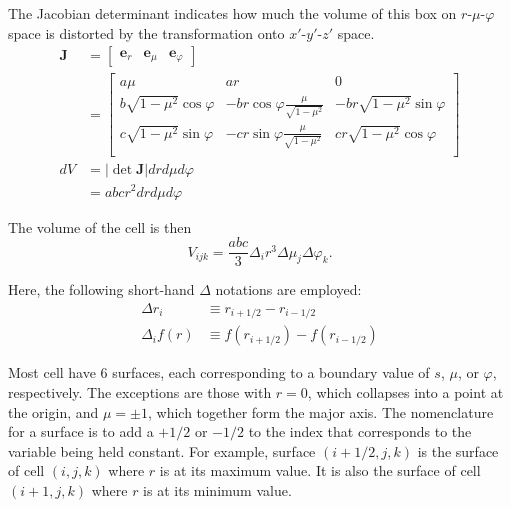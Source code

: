The Jacobian determinant indicates how much the volume of this box on $r$-$\mu$-$\varphi$ space is distorted by the transformation onto $x'$-$y'$-$z'$ space.
\begin{subequations}
    \begin{align}
        \mathbf{J} &= \begin{bmatrix}
            \mathbf{e}_r & \mathbf{e}_\mu & \mathbf{e}_\varphi
        \end{bmatrix} \\
        &= \begin{bmatrix}
            a\mu & ar & 0 \\
            b\sqrt{1-\mu^2} \cos\varphi & \displaystyle -br\cos\varphi\frac{\mu}{\sqrt{1-\mu^2}} & -br\sqrt{1-\mu^2} \sin\varphi \\
            c\sqrt{1-\mu^2} \sin\varphi & \displaystyle -cr\sin\varphi\frac{\mu}{\sqrt{1-\mu^2}} & cr\sqrt{1-\mu^2} \cos\varphi \\
        \end{bmatrix} \\
        dV &= |\det \mathbf{J}| dr d\mu d\varphi \\
        &= abcr^2 dr d\mu d\varphi
    \end{align}
\end{subequations}

The volume of the cell is then
\begin{equation}
    V_{ijk} = \frac{abc}{3} \Delta_i r^3 \Delta\mu_j \Delta\varphi_k  \label{eqn:ellipsoidal_cell_volume}.
\end{equation}

Here, the following short-hand $\Delta$ notations are employed:
\begin{subequations}
    \begin{align}
        \Delta r_i &\equiv r_{i+1/2} - r_{i-1/2} \\
        \Delta_i f(r) &\equiv f(r_{i+1/2}) - f(r_{i-1/2})
    \end{align}
\end{subequations}

Most cell have 6 surfaces, each corresponding to a boundary value of $s$, $\mu$, or $\varphi$, respectively. The exceptions are those with $r=0$, which collapses into a point at the origin, and $\mu = \pm 1$, which
together form the major axis. The nomenclature for a surface is to add a $+1/2$ or $-1/2$ to the index that corresponds to the variable being held constant. For example, surface $(i+1/2,j,k)$ is the surface of
cell $(i,j,k)$ where $r$ is at its maximum value. It is also the surface of cell $(i+1,j,k)$ where $r$ is at its minimum value.

